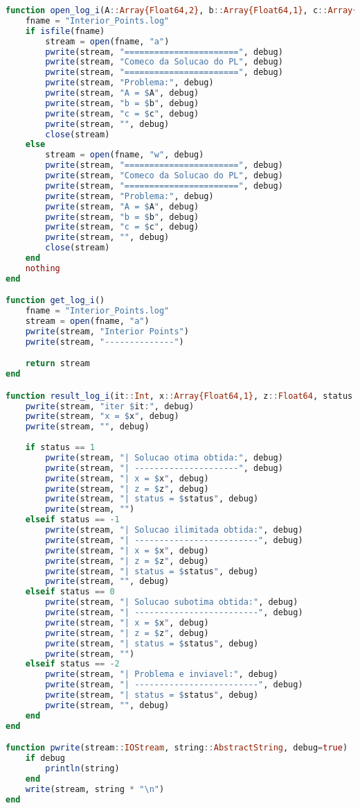 \documentclass[a4paper]{IEEEtran}
\begin{document}
\begin{lstlisting}[language=Julia,numbers=none]
function open_log_i(A::Array{Float64,2}, b::Array{Float64,1}, c::Array{Float64,1}, debug=true)
    fname = "Interior_Points.log"
    if isfile(fname)
        stream = open(fname, "a")
        pwrite(stream, "=======================", debug)
        pwrite(stream, "Comeco da Solucao do PL", debug)
        pwrite(stream, "=======================", debug)
        pwrite(stream, "Problema:", debug)
        pwrite(stream, "A = $A", debug)
        pwrite(stream, "b = $b", debug)
        pwrite(stream, "c = $c", debug)
        pwrite(stream, "", debug)
        close(stream)
    else
        stream = open(fname, "w", debug)
        pwrite(stream, "=======================", debug)
        pwrite(stream, "Comeco da Solucao do PL", debug)
        pwrite(stream, "=======================", debug)
        pwrite(stream, "Problema:", debug)
        pwrite(stream, "A = $A", debug)
        pwrite(stream, "b = $b", debug)
        pwrite(stream, "c = $c", debug)
        pwrite(stream, "", debug)
        close(stream)
    end
    nothing
end

function get_log_i()
    fname = "Interior_Points.log"
    stream = open(fname, "a")
    pwrite(stream, "Interior Points")
    pwrite(stream, "--------------")

    return stream
end

function result_log_i(it::Int, x::Array{Float64,1}, z::Float64, status::Int, stream::IOStream, debug=true)
    pwrite(stream, "iter $it:", debug)
    pwrite(stream, "x = $x", debug)
    pwrite(stream, "", debug)
    
    if status == 1
        pwrite(stream, "| Solucao otima obtida:", debug)
        pwrite(stream, "| ---------------------", debug)
        pwrite(stream, "| x = $x", debug)
        pwrite(stream, "| z = $z", debug)
        pwrite(stream, "| status = $status", debug)
        pwrite(stream, "")
    elseif status == -1
        pwrite(stream, "| Solucao ilimitada obtida:", debug)
        pwrite(stream, "| -------------------------", debug)
        pwrite(stream, "| x = $x", debug)
        pwrite(stream, "| z = $z", debug)
        pwrite(stream, "| status = $status", debug)
        pwrite(stream, "", debug)
    elseif status == 0 
        pwrite(stream, "| Solucao subotima obtida:", debug)
        pwrite(stream, "| -------------------------", debug)
        pwrite(stream, "| x = $x", debug)
        pwrite(stream, "| z = $z", debug)
        pwrite(stream, "| status = $status", debug)
        pwrite(stream, "")
    elseif status == -2 
        pwrite(stream, "| Problema e inviavel:", debug)
        pwrite(stream, "| -------------------------", debug)
        pwrite(stream, "| status = $status", debug)
        pwrite(stream, "", debug)
    end
end

function pwrite(stream::IOStream, string::AbstractString, debug=true)
    if debug
        println(string)
    end
    write(stream, string * "\n")
end

\end{lstlisting}
\end{document}
